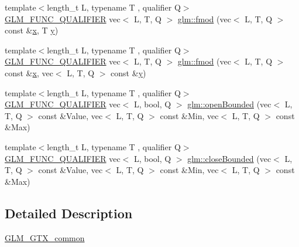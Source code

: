 \begin{DoxyCompactItemize}
\item 
{\footnotesize template$<$length\+\_\+t L, typename T , qualifier Q$>$ }\\\hyperlink{setup_8hpp_a33fdea6f91c5f834105f7415e2a64407}{G\+L\+M\+\_\+\+F\+U\+N\+C\+\_\+\+Q\+U\+A\+L\+I\+F\+I\+ER} vec$<$ L, T, Q $>$ \hyperlink{namespaceglm_a1161c55eb5a2058970a6cc7814e43d40}{glm\+::fmod} (vec$<$ L, T, Q $>$ const \&\hyperlink{_s_d_l__opengl_8h_ad0e63d0edcdbd3d79554076bf309fd47}{x}, T \hyperlink{_s_d_l__opengl_8h_a1675d9d7bb68e1657ff028643b4037e3}{y})
\item 
{\footnotesize template$<$length\+\_\+t L, typename T , qualifier Q$>$ }\\\hyperlink{setup_8hpp_a33fdea6f91c5f834105f7415e2a64407}{G\+L\+M\+\_\+\+F\+U\+N\+C\+\_\+\+Q\+U\+A\+L\+I\+F\+I\+ER} vec$<$ L, T, Q $>$ \hyperlink{namespaceglm_ad9141e6a2a35fc3752fa581605f3dac2}{glm\+::fmod} (vec$<$ L, T, Q $>$ const \&\hyperlink{_s_d_l__opengl_8h_ad0e63d0edcdbd3d79554076bf309fd47}{x}, vec$<$ L, T, Q $>$ const \&\hyperlink{_s_d_l__opengl_8h_a1675d9d7bb68e1657ff028643b4037e3}{y})
\item 
{\footnotesize template$<$length\+\_\+t L, typename T , qualifier Q$>$ }\\\hyperlink{setup_8hpp_a33fdea6f91c5f834105f7415e2a64407}{G\+L\+M\+\_\+\+F\+U\+N\+C\+\_\+\+Q\+U\+A\+L\+I\+F\+I\+ER} vec$<$ L, bool, Q $>$ \hyperlink{group__gtx__common_gafd303042ba2ba695bf53b2315f53f93f}{glm\+::open\+Bounded} (vec$<$ L, T, Q $>$ const \&Value, vec$<$ L, T, Q $>$ const \&Min, vec$<$ L, T, Q $>$ const \&Max)
\item 
{\footnotesize template$<$length\+\_\+t L, typename T , qualifier Q$>$ }\\\hyperlink{setup_8hpp_a33fdea6f91c5f834105f7415e2a64407}{G\+L\+M\+\_\+\+F\+U\+N\+C\+\_\+\+Q\+U\+A\+L\+I\+F\+I\+ER} vec$<$ L, bool, Q $>$ \hyperlink{group__gtx__common_gab7d89c14c48ad01f720fb5daf8813161}{glm\+::close\+Bounded} (vec$<$ L, T, Q $>$ const \&Value, vec$<$ L, T, Q $>$ const \&Min, vec$<$ L, T, Q $>$ const \&Max)
\end{DoxyCompactItemize}


\subsection{Detailed Description}
\hyperlink{group__gtx__common}{G\+L\+M\+\_\+\+G\+T\+X\+\_\+common} 